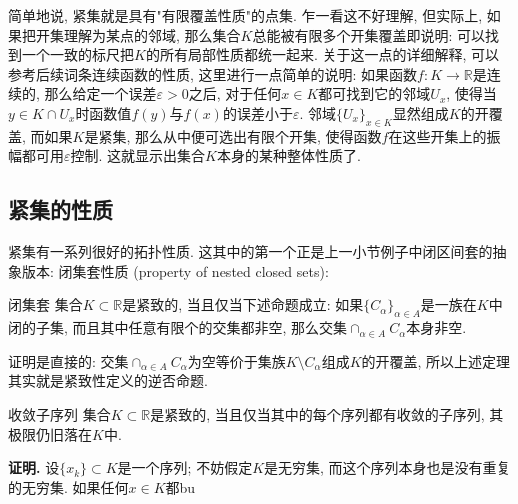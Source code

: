 简单地说, 紧集就是具有"有限覆盖性质"的点集. 乍一看这不好理解, 但实际上, 如果把开集理解为某点的邻域, 那么集合$K$总能被有限多个开集覆盖即说明: 可以找到一个一致的标尺把$K$的所有局部性质都统一起来. 关于这一点的详细解释, 可以参考后续词条连续函数的性质, 这里进行一点简单的说明: 如果函数$f:K\to\mathbb{R}$是连续的, 那么给定一个误差$\varepsilon>0$之后, 对于任何$x\in K$都可找到它的邻域$U_{x}$, 使得当$y\in K\cap U_x$时函数值$f(y)$与$f(x)$的误差小于$\varepsilon$. 邻域$\{U_x\}_{x\in K}$显然组成$K$的开覆盖, 而如果$K$是紧集, 那么从中便可选出有限个开集, 使得函数$f$在这些开集上的振幅都可用$\varepsilon$控制. 这就显示出集合$K$本身的某种整体性质了.

\subsection{紧集的性质}
紧集有一系列很好的拓扑性质. 这其中的第一个正是上一小节例子中闭区间套的抽象版本: 闭集套性质 (property of nested closed sets):

\begin{theorem}{闭集套}
集合$K\subset\mathbb{R}$是紧致的, 当且仅当下述命题成立: 如果$\{C_\alpha\}_{\alpha\in A}$是一族在$K$中闭的子集, 而且其中任意有限个的交集都非空, 那么交集$\cap_{\alpha\in A}C_\alpha$本身非空. 
\end{theorem}

证明是直接的: 交集$\cap_{\alpha\in A}C_\alpha$为空等价于集族$K\setminus C_\alpha$组成$K$的开覆盖, 所以上述定理其实就是紧致性定义的逆否命题.

\begin{theorem}{收敛子序列}
集合$K\subset\mathbb{R}$是紧致的, 当且仅当其中的每个序列都有收敛的子序列, 其极限仍旧落在$K$中.
\end{theorem}

\textbf{证明.} 设$\{x_k\}\subset K$是一个序列; 不妨假定$K$是无穷集, 而这个序列本身也是没有重复的无穷集. 如果任何$x\in K$都bu